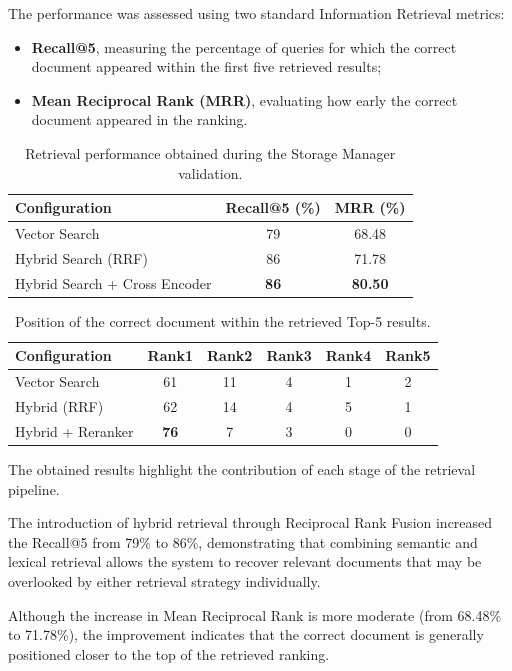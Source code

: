 The performance was assessed using two standard Information Retrieval metrics:

\begin{itemize}
    \item \textbf{Recall@5}, measuring the percentage of queries for which the correct document appeared within the first five retrieved results;
    \item \textbf{Mean Reciprocal Rank (MRR)}, evaluating how early the correct document appeared in the ranking.
\end{itemize}

\begin{table}[H]
\centering
\caption{Retrieval performance obtained during the Storage Manager validation.}
\label{tab:rag_validation}
\begin{tabular}{lcc}
\toprule
Configuration & Recall@5 (\%) & MRR (\%)\\
\midrule
Vector Search & 79 & 68.48\\
Hybrid Search (RRF) & 86 & 71.78\\
Hybrid Search + Cross Encoder & \textbf{86} & \textbf{80.50}\\
\bottomrule
\end{tabular}
\end{table}


\begin{table}[H]
\centering
\caption{Position of the correct document within the retrieved Top-5 results.}
\label{tab:position_distribution}
\begin{tabular}{lccccc}
\toprule
Configuration & Rank1 & Rank2 & Rank3 & Rank4 & Rank5\\
\midrule
Vector Search & 61 & 11 & 4 & 1 & 2\\
Hybrid (RRF) & 62 & 14 & 4 & 5 & 1\\
Hybrid + Reranker & \textbf{76} & 7 & 3 & 0 & 0\\
\bottomrule
\end{tabular}
\end{table}

The obtained results highlight the contribution of each stage of the retrieval pipeline.

The introduction of hybrid retrieval through Reciprocal Rank Fusion increased the Recall@5 from 79\% to 86\%, demonstrating that combining semantic and lexical retrieval allows the system to recover relevant documents that may be overlooked by either retrieval strategy individually.

Although the increase in Mean Reciprocal Rank is more moderate (from 68.48\% to 71.78\%), the improvement indicates that the correct document is generally positioned closer to the top of the retrieved ranking.

